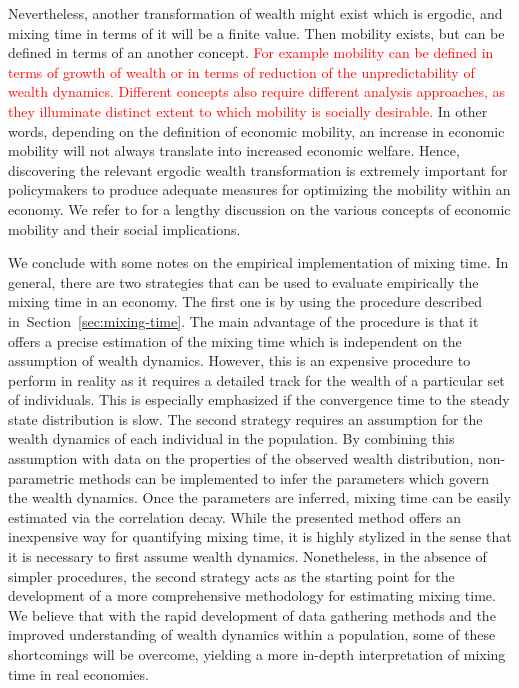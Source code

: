 \documentclass[11pt]{article}
\newcommand{\Sref}[1]{Section~\ref{sec:#1}}
\numberwithin{equation}{section}
\begin{document}
Nevertheless, another transformation of wealth might exist which is ergodic, and mixing time in terms of it will be a finite value. Then mobility exists, but can be defined in terms of an another concept. \textcolor{red}{For example mobility can be defined in terms of growth of wealth or in terms of reduction of the unpredictability of wealth dynamics. Different concepts also require different analysis approaches, as they illuminate distinct extent to which mobility is socially desirable.} In other words, depending on the definition of economic mobility, an increase in economic mobility will not always translate into increased economic welfare. Hence, discovering the relevant ergodic wealth transformation is extremely important for policymakers to produce adequate measures for optimizing the mobility within an economy. We refer to \citet{JanttiJenkins2015} for a lengthy discussion on the various concepts of economic mobility and their social implications.

We conclude with some notes on the empirical implementation of mixing time. In general, there are two strategies that can be used to evaluate empirically the mixing time in an economy. The first one is by using the procedure described in~\Sref{mixing-time}. The main advantage of the procedure is that it offers a precise estimation of the mixing time which is independent on the assumption of wealth dynamics. However, this is an expensive procedure to perform in reality as it requires a detailed track for the wealth of a particular set of individuals. This is especially emphasized if the convergence time to the steady state distribution is slow. The second strategy requires an assumption for the wealth dynamics of each individual in the population. By combining this assumption with data on the properties of the observed wealth distribution, non-parametric methods can be implemented to infer the parameters which govern the wealth dynamics. Once the parameters are inferred, mixing time can be easily estimated via the correlation decay.  While the presented method offers an inexpensive way for quantifying mixing time, it is highly stylized in the sense that it is necessary to first assume wealth dynamics. Nonetheless, in the absence of simpler procedures, the second strategy acts as the starting point for the development of a more comprehensive methodology for estimating mixing time. We believe that with the rapid development of data gathering methods and the improved understanding of wealth dynamics within a population, some of these shortcomings will be overcome, yielding a more in-depth interpretation of mixing time in real economies.
\end{document}
